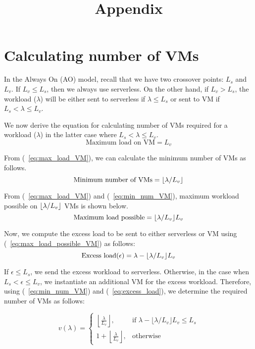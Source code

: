\documentclass[letter,9pt, twocolumn]{article}
\title{\bf{Appendix}}
\date{}
\DeclarePairedDelimiter\floor{\lfloor}{\rfloor}
\begin{document}
\maketitle

\section{Calculating number of VMs}

In the Always On (AO) model, recall that we have two crossover points: $L_s$ and $L_v$. If $L_v \leq L_s$,  then we always use serverless. On the other hand, if $L_v > L_s$, the workload ($\lambda$) will be either sent to serverless if $\lambda \leq L_s$ or sent to VM if $L_s < \lambda \leq L_v$. 

We now derive the equation for calculating number of VMs required for a workload ($\lambda$) in the latter case where $L_s < \lambda \leq L_v$. 
\begin{equation}
\text{Maximum load on VM} = L_v
\label{eq:max_load_VM}
\end{equation}

From (~\ref{eq:max_load_VM}), we can calculate the minimum number of VMs as follows.
\begin{equation}
\text{Minimum number of VMs}= \floor*{\lambda/L_v}
\label{eq:min_num_VM}
\end{equation}

From (~\ref{eq:max_load_VM}) and (~\ref{eq:min_num_VM}), maximum workload possible on $\floor*{\lambda/L_v}$ VMs is shown below.
\begin{equation}
\text{Maximum load possible} = \floor*{\lambda/L_v} L_v
\label{eq:max_load_possible_VM}
\end{equation}

Now, we compute the excess load to be sent to either serverless or VM using (~\ref{eq:max_load_possible_VM}) as follows:
\begin{equation}
\text{Excess load} (\epsilon) = \lambda - \floor*{\lambda/L_v} L_v
\label{eq:excess_load}
\end{equation}

If $\epsilon \leq L_s$, we send the excess workload to serverless. Otherwise, in the case when  $L_s < \epsilon \leq L_v$, we instantiate an additional VM for the excess workload. Therefore, using (~\ref{eq:min_num_VM}) and (~\ref{eq:excess_load}), we determine the required number of VMs as follows:

\begin{equation}
v(\lambda)= 
\begin{cases}
    \left \lfloor \frac{\lambda}{L_v} \right \rfloor , & \text{if } \lambda - \lfloor {\lambda/L_v}\rfloor L_v \leq L_s\\ 
    1 + \left \lfloor \frac{\lambda}{L_v} \right \rfloor , & \text{otherwise}
\end{cases}
\label{eq:num_VMs}
\end{equation}
\end{document}
